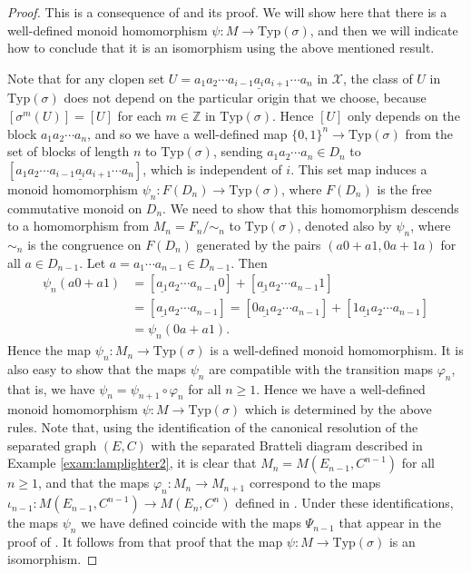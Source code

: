 \documentclass[11pt]{amsart}
\def\ul{\underline}
\theoremstyle{plain}            %
\theoremstyle{definition}       %
\theoremstyle{definition}       %
\theoremstyle{remark}
\newcommand{\Typ}{\mathrm{Typ}}
\def\Z{\mathbb{Z}}
\begin{document}
\begin{proof}
This is a consequence of \cite[Theorem 7.4]{ae14} and its proof. We will show here that there is a well-defined monoid homomorphism $\psi \colon M\to \Typ (\sigma)$, and then we will indicate how to conclude that it is an isomorphism using the above mentioned result. 

Note that for any clopen set $U = a_1a_2 \cdots a_{i-1}\underline{a_i} a_{i+1}\cdots a_n$ in $\mathcal X$, the class of $U$ in $\Typ (\sigma)$ does not depend 
on the particular origin that we choose, because $[\sigma^m(U)] = [U]$ for each $m\in \Z$ in $\Typ (\sigma)$. Hence $[U]$ only depends on the block $a_1a_2\cdots a_n$, and so we have a 
well-defined map $\{0,1\}^n\to \Typ (\sigma)$ from the set of blocks of length $n$ to $\Typ (\sigma)$, sending $a_1a_2\cdots a_n\in D_n$ to $[a_1a_2 \cdots a_{i-1}\underline{a_i} a_{i+1}\cdots a_n]$, which is independent of $i$. This set map induces a monoid homomorphism $\psi_n \colon F(D_n)\to \Typ (\sigma)$, where $F(D_n)$ is the free commutative monoid on $D_n$. 
We need to show that this homomorphism descends to a homomorphism from $M_n= F_n/{\sim_n}$ to $\Typ(\sigma)$, denoted also by $\psi_n$, where $\sim_n$ is the congruence on $F(D_n)$ generated by the pairs
$(a0+a1,0a+1a)$ for all $a\in D_{n-1}$. Let $a=a_1\cdots a_{n-1}\in D_{n-1}$. Then 
\begin{align*}
\psi _n (a0 +a1) & =[\underline{a_1}a_2\cdots a_{n-1}0] + [\underline{a_1}a_2\cdots a_{n-1}1] \\
& = [\ul{a_1}a_2\cdots a_{n-1}] =[0\ul{a_1}a_2\cdots a_{n-1}] + [1\ul{a_1}a_2\cdots a_{n-1}]\\
& =\psi _n (0a+a1).
\end{align*}
Hence the map $\psi_n \colon M_n\to \Typ (\sigma)$ is a well-defined monoid homomorphism. It is also easy to show that the maps $\psi_n$ are compatible with the transition maps $\varphi_n$, that is, we have $\psi_{n} = \psi_{n+1}\circ \varphi_n $ for all $n\ge 1$. Hence we have a well-defined monoid homomorphism $\psi \colon M\to \Typ (\sigma)$ which is determined by the above rules. Note that, using the identification of the canonical resolution of the separated graph $(E,C)$ with the separated Bratteli diagram described in Example \ref{exam:lamplighter2}, it is clear that $M_n=M(E_{n-1},C^{n-1})$ for all $n\ge 1$, and that the maps $\varphi_n\colon M_n\to M_{n+1}$ correspond to the maps $\iota_{n-1} \colon M(E_{n-1},C^{n-1}) \to M(E_{n},C^{n})$ defined in \cite[Lemma 4.5]{ae14}. Under these identifications, the maps $\psi_n$ we have defined coincide with the maps $\Psi_{n-1}$ that appear in the proof of \cite[Theorem 7.4]{ae14}. It follows from that proof that the map $\psi\colon M\to \Typ (\sigma)$ is an isomorphism.       


\end{proof}
\end{document}
